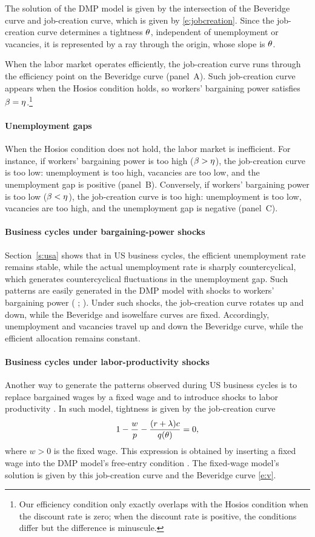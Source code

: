 \documentclass[letterpaper,12pt,leqno]{article}
\begin{document}
The solution of the DMP model is given by the intersection of the Beveridge curve and job-creation curve, which is given by \eqref{e:jobcreation}. Since the job-creation curve determines a tightness $\theta$, independent of unemployment or vacancies, it is represented by a ray through the origin, whose slope is $\theta$. 

When the labor market operates efficiently, the job-creation curve runs through the efficiency point on the Beveridge curve (panel~A). Such job-creation curve appears when the Hosios condition holds, so workers' bargaining power satisfies $\beta = \eta$.\footnote{Our efficiency condition only exactly overlaps with the Hosios condition when the discount rate is zero; when the discount rate is positive, the conditions differ but the difference is minuscule.}

\paragraph{Unemployment gaps} When the Hosios condition does not hold, the labor market is inefficient. For instance, if workers' bargaining power is too high ($\beta > \eta$), the job-creation curve is too low: unemployment is too high, vacancies are too low, and the unemployment gap is positive (panel~B). Conversely, if workers' bargaining power is too low ($\beta < \eta$), the job-creation curve is too high: unemployment is too low, vacancies are too high, and the unemployment gap is negative (panel~C).

\paragraph{Business cycles under bargaining-power shocks}  Section~\ref{s:usa} shows that in US business cycles, the efficient unemployment rate remains stable, while the actual unemployment rate is sharply countercyclical, which generates countercyclical fluctuations in the unemployment gap. Such patterns are easily generated in the DMP model with shocks to workers' bargaining power ( ; ). Under such shocks, the job-creation curve rotates up and down, while the Beveridge and isowelfare curves are fixed. Accordingly, unemployment and vacancies travel up and down the Beveridge curve, while the efficient allocation remains constant.

\paragraph{Business cycles under labor-productivity shocks} Another way to generate the patterns observed during US business cycles is to replace bargained wages by a fixed wage and to introduce shocks to labor productivity . In such model, tightness is given by the job-creation curve
\begin{equation}
1 - \frac{w}{p} - \frac{(r+\lambda)c}{q(\theta)} = 0,
\label{e:jobcreationhall}\end{equation}
where $w>0$ is the fixed wage. This expression is obtained by inserting a fixed wage into the DMP model's free-entry condition . The fixed-wage model's solution is given by this job-creation curve and the Beveridge curve \eqref{e:v}. 
\end{document}
